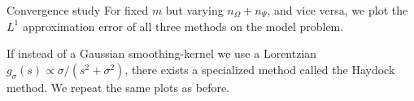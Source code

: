 \documentclass[final, 12pt]{beamer}
\begin{document}
\begin{frame}[t]
\begin{columns}[t]
\begin{column}{0.45\paperwidth}
        \begin{block}{Convergence study}
            For fixed $m$ but varying $n_{\Omega} + n_{\Psi}$, and vice versa,
            we plot the $L^1$ approximation error of all three methods on the
            model problem.
            \begin{figure}
                \scalebox{1.6}{}
                \scalebox{1.6}{}
            \end{figure}
            \vspace{-30pt}
            If instead of a Gaussian \gls{smoothing-kernel} we use a Lorentzian
            $g_{\sigma}(s) \propto \sigma / (s^2 + \sigma^2)$,
            there exists a specialized method called the Haydock method. We repeat 
            the same plots as before.%
            \begin{figure}
                \scalebox{1.6}{}
                \scalebox{1.6}{}
            \end{figure}
            \vspace{-30pt}
        \end{block}

    \end{column}

\end{columns}


\end{frame}
\end{document}
